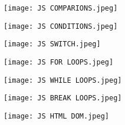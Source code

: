 \documentclass{article}
\begin{document}
\begin{itemize}
            \newline \newline \newline
            \newline \newline \newline
            \texttt{[image: JS COMPARIONS.jpeg]}

            \newline \newline \newline
            \newline \newline \newline
            \texttt{[image: JS CONDITIONS.jpeg]}

            \newline \newline \newline
            \newline \newline \newline
            \texttt{[image: JS SWITCH.jpeg]}

            \newline \newline \newline
            \newline \newline \newline
            \texttt{[image: JS FOR LOOPS.jpeg]}

            \newline \newline \newline
            \newline \newline \newline
            \texttt{[image: JS WHILE LOOPS.jpeg]}

            \newline \newline \newline
            \newline \newline \newline
            \texttt{[image: JS BREAK LOOPS.jpeg]}

            \newline \newline \newline
            \newline \newline \newline
            \texttt{[image: JS HTML DOM.jpeg]}
            
	\end{itemize}	
    \clearpage
\end{document}
